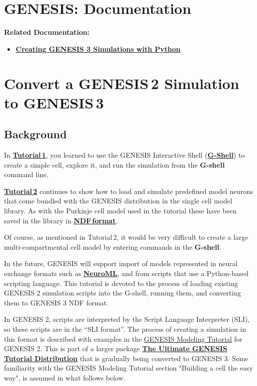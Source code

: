\documentclass[12pt]{article}
\begin{document}
\section*{GENESIS: Documentation}

{\bf Related Documentation:}

\begin{itemize}
   \item[]\href{../tutorial-python-scripting/tutorial-python-scripting.html}
          {\bf Creating GENESIS 3 Simulations with Python}
\end{itemize}

\section*{Convert a GENESIS\,2 Simulation to GENESIS\,3}

\subsection*{Background}

In \href{../tutorial1/tutorial1.tex}{\bf Tutorial\,1}, you learned to use the GENESIS Interactive Shell (\href{../gshell/gshell.tex}{\bf G-Shell})
to create a simple cell, explore it, and run the simulation from the
{\bf G-shell} command line.

\href{../tutorial2/tutorial2.tex}{\bf Tutorial\,2} continues to show how to load and simulate predefined model
neurons that come bundled with the GENESIS distribution in the single
cell model library.  As with the Purkinje cell model used in the
tutorial these have been saved in the library in \href{../ndf-file-format/ndf-file-format.tex}{\bf NDF\,format}.

Of course, as mentioned in Tutorial\,2, it would be very difficult to create a large multi-compartmental
cell model by entering commands in the {\bf G-shell}.

In the future, GENESIS will support import of models represented in neural exchange formats such as
\href{http://neuroml.org}{\bf NeuroML}, and from scripts that use a Python-based scripting language.
This tutorial is devoted to the process of loading existing GENESIS 2 simulation scripts into the
G-shell, running them, and converting them to GENESIS 3 NDF format.

In GENESIS 2, scripts are interpreted by the Script Language Interpreter (SLI), so these scripts are
in the ``SLI format''.  The process of creating a simulation in this format is described with
examples in the \href{http://genesis-sim.org/GENESIS/UGTD/Tutorials/genprog/genprog.html}{GENESIS
Modeling Tutorial} for GENESIS 2.  This is part of a larger package
\href{http://www.genesis-sim.org/GENESIS/UGTD.html}{\bf The Ultimate GENESIS Tutorial Distribution}
that is gradually being converted to GENESIS 3.  Some familiarity with the GENESIS Modeling Tutorial
section "Building a cell the easy way", is assumed in what follows below.
\end{document}
